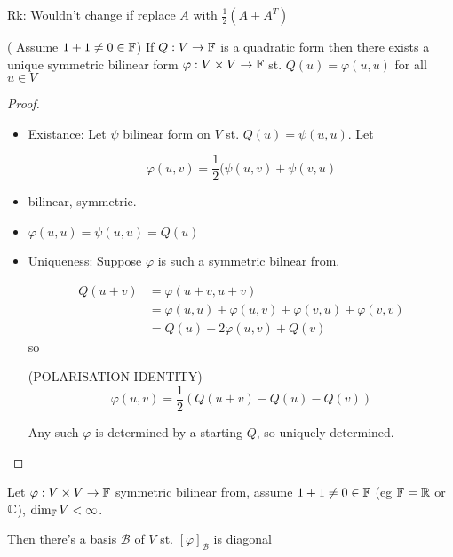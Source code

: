 \documentclass[a4paper]{article}
\begin{document}
Rk: Wouldn't change if replace $ A $ with $ \frac{1}{2} (A + A^{T})  $

\begin{prop} ( Assume $ 1 + 1 \neq 0 \in \mathbb{F} $)
	If $ Q : V \to \mathbb{F} $ is a quadratic form then there exists a unique symmetric bilinear form $ \varphi: V \times V \to \mathbb{F} $ st. $ Q(u) = \varphi(u,u)  $ for all $ u \in V $
\end{prop}

\begin{proof}
	\begin{itemize}
		\item Existance: Let $ \psi  $ bilinear form on $ V $ st. $ Q(u) = \psi(u,u) $. Let 
		
		\[ \varphi(u,v) = \frac{1}{2} (    \psi(u,v) + \psi(v,u ) \]
		
		\item bilinear, symmetric.
		\item $ \varphi(u,u) = \psi(u,u) = Q(u) $
		
		\item Uniqueness: Suppose $ \varphi $ is such a symmetric bilnear from. 
		
		
		\begin{align*}
		Q(u+v)& = \varphi(u+v,u+v)  \\
		& = \varphi(u,u) + \varphi(u,v) + \varphi(v,u) + \varphi(v,v) \\
		& = Q(u) + 2\varphi(u,v) + Q(v)
		\end{align*}
		so
		
		(POLARISATION IDENTITY)
		\[ \varphi(u,v) = \frac{1}{2} \left(  Q(u+v) - Q(u) - Q(v) \right)  \]

		Any such $ \varphi $ is determined by a starting $ Q $, so uniquely determined.
		
	\end{itemize}
\end{proof}

\begin{thm} 
	Let $ \varphi : V \times V \to \mathbb{F} $ symmetric bilinear from, assume $ 1 + 1 \neq 0 \in \mathbb{F} $ (eg $ \mathbb{F} = \mathbb{R} $ or $ \mathbb{C} $), $ \dim_{\mathbb{F}}V < \infty $.
	
	Then there's a basis $ \mathcal{B} $ of $ V $ st. $ [\varphi]_{\mathcal{B}} $ is diagonal
\end{thm}
\end{document}
